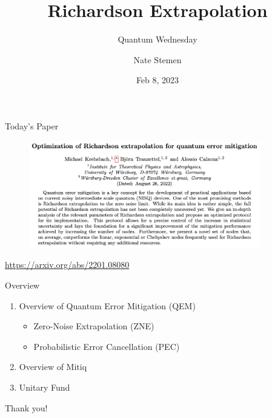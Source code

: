 \documentclass[11pt,aspectratio=1610,xcolor=dvipsnames]{beamer}
\title{Richardson Extrapolation}
\subtitle{Quantum Wednesday}
\date{Feb 8, 2023}
\author{Nate Stemen}
\begin{document}
\maketitle

\begin{frame}{Today's Paper}
	\begin{figure}[h]
		\centering
		\includegraphics[width=0.9\textwidth]{abstract.png}
	\end{figure}
	\begin{center}
		\url{https://arxiv.org/abs/2201.08080}
	\end{center}
\end{frame}

\begin{frame}{Overview}
	\begin{enumerate}
		\item Overview of Quantum Error Mitigation (QEM)
		      \begin{itemize}
			      \item Zero-Noise Extrapolation (ZNE)
			      \item Probabilistic Error Cancellation (PEC)
		      \end{itemize}
		\item Overview of Mitiq
		\item Unitary Fund
	\end{enumerate}
\end{frame}


\begin{frame}[standout]
	Thank you!
\end{frame}
\end{document}
